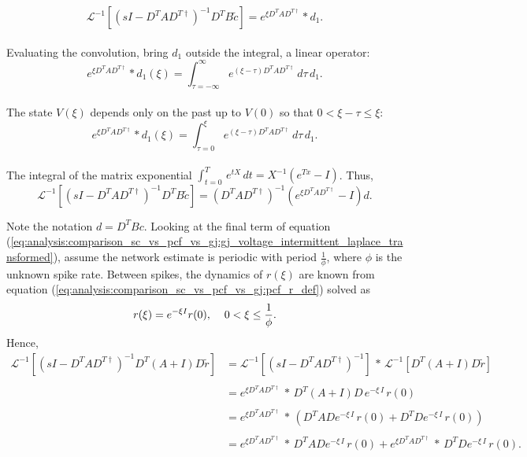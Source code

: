 \begin{enumerate}
$$
	\mathcal{L}^{-1}
	\left[
		\left(
			sI - D^T A D^{T \dagger}
		\right)^{-1}
		D^T B \tilde{c}
	\right]
	=
	e^{\xi D^T A D^{T \dagger}} * d_1.
$$
\\
Evaluating the convolution, bring $d_1$ outside the integral, a linear operator:
$$
	e^{\xi D^T A D^{T \dagger}} * d_1 (\xi)
	=
	\int_{\tau=-\infty}^{\infty}
		e^{
		\left(
			\xi - \tau
		\right)
		 D^T A D^{T \dagger}} 
	\, d\tau
	 \, d_1.
$$
\\
The state $V(\xi)$ depends only on the past up to $V(0)$ so that $0 < \xi - \tau \leq  \xi$: 
\\
$$
	e^{\xi D^T A D^{T \dagger}} * d_1 (\xi)
	=
	\int_{\tau=0}^{\xi}
		e^{
		\left(
			\xi - \tau
		\right)
		 D^T A D^{T \dagger}}  
	\, d\tau
	\, d_1.
$$
\\
The integral of the matrix exponential $\int_{t=0}^{T} \, e^{tX} \, dt= X^{-1} \left(e^{Tx} - I \right)$. Thus,
\\
\begin{equation}
\label{eq:analysis:comparison_sc_vs_pcf_vs_gj:gj_voltage_intermittent_laplace_transformed_term_2}
	\mathcal{L}^{-1}
	\left[
		\left(
			sI - D^T A D^{T \dagger}
		\right)^{-1}
		D^T B \tilde{c}
	\right]
=
\left(
	D^T A D^{T \dagger}
\right)^{-1}
\left(
	e^{\xi D^T A D^{T \dagger}} - I
\right)
d.
\end{equation}

Note the notation $d = D^T B c$. 
Looking at the final term of equation (\ref{eq:analysis:comparison_sc_vs_pcf_vs_gj:gj_voltage_intermittent_laplace_transformed}), assume the network estimate is periodic with period $\frac{1}{\phi}$, where $\phi$ is the unknown spike rate. Between spikes, the dynamics of $r(\xi)$ are known from equation (\ref{eq:analysis:comparison_sc_vs_pcf_vs_gj:pcf_r_def}) solved as
$$
	r(\xi) = e^{-\xi I} r(0), \hspace{4mm} 0 < \xi \leq  \frac{1}{\phi}.
$$
Hence, 
\begin{align*}
	\mathcal{L}^{-1}
	\left[
		\left(
			sI - D^T A D^{T \dagger}
		\right)^{-1}
		D^T 
		\left(
			A + I
		\right)	
		D \tilde{r}
	\right]
	&= 
	\mathcal{L}^{-1}
	\left[
		\left(
			sI - D^T A D^{T \dagger}
		\right)^{-1}		
	\right]
	\, 
	*	
	\,
	\mathcal{L}^{-1}
	\left[
		D^T 
		\left(
			A + I
		\right)	
		D \tilde{r}
	\right]
	\\
	\\
	&=
	e^{\xi D^T A D^{T \dagger}}
	\, 
	*	
	\,
		D^T 
		\left(
			A + I
		\right)	
		D \, 
		e^{-\xi \, I} \, r(0)		
	\\
	\\
	&= 	e^{\xi D^T A D^{T \dagger}}
	\, 
	*	
	\,
	\left(
		D^T A D e^{-\xi \, I} \, r(0)
		+
		D^T D e^{-\xi \, I} \, r(0)
	\right)	
	\\
	\\
	&=
	e^{\xi D^T A D^{T \dagger}}
	\, 	*  \,
	D^T A D e^{-\xi \, I} \, r(0)	
	+
	e^{\xi D^T A D^{T \dagger}}
	\, 	*  \,
	D^T D e^{-\xi \, I} \, r(0).	
\end{align*}


\end{enumerate}
